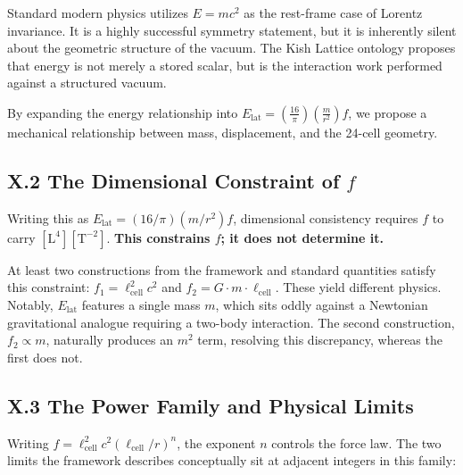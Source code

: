 \documentclass[11pt, letterpaper, openany]{book}
\begin{document}
Standard modern physics utilizes $E=mc^2$ as the rest-frame case of Lorentz invariance. It is a highly successful symmetry statement, but it is inherently silent about the geometric structure of the vacuum. The Kish Lattice ontology proposes that energy is not merely a stored scalar, but is the interaction work performed against a structured vacuum. 

By expanding the energy relationship into $E_{\mathrm{lat}} = \left(\frac{16}{\pi}\right)\left(\frac{m}{r^2}\right) f$, we propose a mechanical relationship between mass, displacement, and the 24-cell geometry.

\subsection*{X.2 The Dimensional Constraint of $f$}

Writing this as $E_{\mathrm{lat}} = (16/\pi)(m/r^2)f$, dimensional consistency requires $f$ to carry $[\mathrm{L}^4][\mathrm{T}^{-2}]$. \textbf{This constrains $f$; it does not determine it.} 

At least two constructions from the framework and standard quantities satisfy this constraint: $f_1 = \ell_{\text{cell}}^2 c^2$ and $f_2 = G \cdot m \cdot \ell_{\text{cell}}$. These yield different physics. Notably, $E_{\mathrm{lat}}$ features a single mass $m$, which sits oddly against a Newtonian gravitational analogue requiring a two-body interaction. The second construction, $f_2 \propto m$, naturally produces an $m^2$ term, resolving this discrepancy, whereas the first does not.

\subsection*{X.3 The Power Family and Physical Limits}

Writing $f = \ell_{\text{cell}}^2 c^2 (\ell_{\text{cell}}/r)^n$, the exponent $n$ controls the force law. The two limits the framework describes conceptually sit at adjacent integers in this family:
\end{document}
